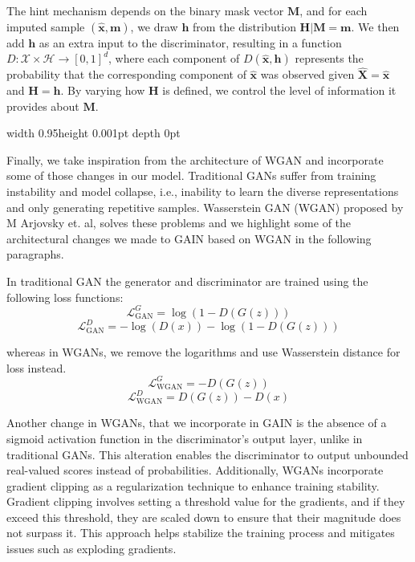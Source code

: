 \documentclass[conference]{IEEEtran}
\begin{document}
The hint mechanism depends on the binary mask vector \( \mathbf{M} \), and for each imputed sample \( (\hat{\mathbf{x}}, \mathbf{m}) \), we draw \( \mathbf{h} \) from the distribution \( \mathbf{H} | \mathbf{M} = \mathbf{m} \). We then add \( \mathbf{h} \) as an extra input to the discriminator, resulting in a function \( D: \mathcal{X} \times \mathcal{H} \rightarrow [0, 1]^d \), where each component of \( D(\hat{\mathbf{x}}, \mathbf{h}) \) represents the probability that the corresponding component of \( \hat{\mathbf{x}} \) was observed given \( \hat{\mathbf{X}} = \hat{\mathbf{x}} \) and \( \mathbf{H} = \mathbf{h} \).
By varying how \( \mathbf{H} \) is defined, we control the level of information it provides about \( \mathbf{M} \).

\textcolor{gray!80}{\vrule width 0.95\columnwidth height 0.001pt depth 0pt \relax}

\vspace{1ex}

Finally, we take inspiration from the architecture of WGAN and incorporate some of those changes in our model. Traditional GANs suffer from training instability and model collapse, i.e., inability to learn the diverse representations and only generating repetitive samples. Wasserstein GAN (WGAN) proposed by M Arjovsky et. al, solves these problems and we highlight some of the architectural changes we made to GAIN based on WGAN in the following paragraphs.

In traditional GAN the generator and discriminator are trained using the following loss functions:
\[
\mathcal{L}_{\text{GAN}}^G = \log(1 - D(G(z)))
\]
\[
\mathcal{L}_{\text{GAN}}^D = -\log(D(x)) - \log(1 - D(G(z)))
\]

whereas in WGANs, we remove the logarithms and use Wasserstein distance for loss instead.
\[
\mathcal{L}_{\text{WGAN}}^G = -D(G(z))
\]
\[
\mathcal{L}_{\text{WGAN}}^D = D(G(z)) - D(x)
\]

Another change in WGANs, that we incorporate in GAIN is the absence of a sigmoid activation function in the discriminator's output layer, unlike in traditional GANs. This alteration enables the discriminator to output unbounded real-valued scores instead of probabilities. Additionally, WGANs incorporate gradient clipping as a regularization technique to enhance training stability. Gradient clipping involves setting a threshold value for the gradients, and if they exceed this threshold, they are scaled down to ensure that their magnitude does not surpass it. This approach helps stabilize the training process and mitigates issues such as exploding gradients.
\end{document}
